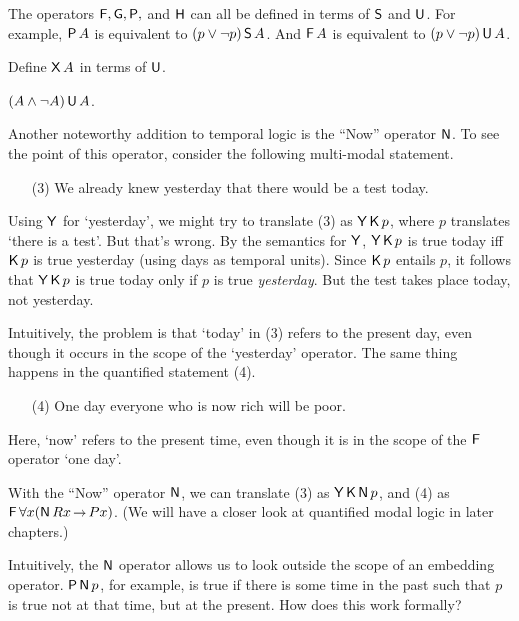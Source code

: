 The operators $\operatorname{\mathsf{F}}, \operatorname{\mathsf{G}},\operatorname{\mathsf{P}},$ and $\operatorname{\mathsf{H}}$ can all be defined in terms of $\operatorname{\mathsf{S}}$ and
$\operatorname{\mathsf{U}}$. For example, $\operatorname{\mathsf{P}} A$ is equivalent to $(p\lor \neg p)\operatorname{\mathsf{S}} A$. And $\operatorname{\mathsf{F}} A$
is equivalent to $(p \lor \neg p)\operatorname{\mathsf{U}} A$.

\begin{exercise}
  Define $\operatorname{\mathsf{X}} A$ in terms of $\operatorname{\mathsf{U}}$.
\end{exercise}
\begin{solution}
  $(A \land \neg A) \operatorname{\mathsf{U}} A$.
\end{solution}

Another noteworthy addition to temporal logic is the ``Now'' operator $\operatorname{\mathsf{N}}$.
To see the point of this operator, consider the following multi-modal statement.

\begin{itemize}[leftmargin=10mm]
  \itemsep-1mm
\item[(3)] We already knew yesterday that there would be a test today.
\end{itemize}

Using $\operatorname{\mathsf{Y}}$ for `yesterday', we might try to translate (3) as $\operatorname{\mathsf{Y}} \operatorname{\mathsf{K}{}} p$, where
$p$ translates `there is a test'. But that's wrong. By the semantics for $\operatorname{\mathsf{Y}}$,
$\operatorname{\mathsf{Y}} \operatorname{\mathsf{K}{}} p$ is true today iff $\operatorname{\mathsf{K}{}} p$ is true yesterday (using days as temporal
units). Since $\operatorname{\mathsf{K}{}} p$ entails $p$, it follows that $\operatorname{\mathsf{Y}} \operatorname{\mathsf{K}{}} p$ is true today
only if $p$ is true \emph{yesterday}. But the test takes place today, not
yesterday.

Intuitively, the problem is that `today' in (3) refers to the present day, even
though it occurs in the scope of the `yesterday' operator. The same thing
happens in the quantified statement (4).
%
\begin{itemize}[leftmargin=10mm]
  \itemsep-1mm
\item[(4)] One day everyone who is now rich will be poor.
\end{itemize}
% 
Here, `now' refers to the present time, even though it is in the scope
of the $\operatorname{\mathsf{F}}$ operator `one day'.


With the ``Now'' operator $\operatorname{\mathsf{N}}$, we can translate (3) as $\operatorname{\mathsf{Y}} \operatorname{\mathsf{K}{}} \operatorname{\mathsf{N}} p$, and
(4) as $\tF \forall x (\tN Rx \to Px)$. (We will have a closer look at
quantified modal logic in later chapters.)

Intuitively, the $\operatorname{\mathsf{N}}$ operator allows us to look outside the scope of an
embedding operator. $\operatorname{\mathsf{P}} \operatorname{\mathsf{N}} p$, for example, is true if there is some time in
the past such that $p$ is true not at that time, but at the present. How
does this work formally?

